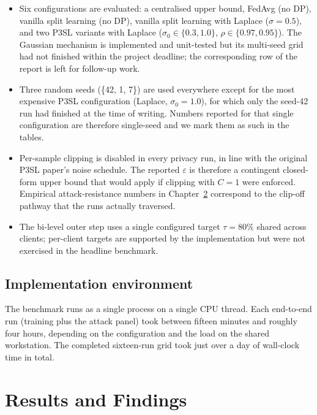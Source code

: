 \documentclass[11pt,a4paper,oneside]{report}
\begin{document}
\begin{itemize}[itemsep=2pt]
 \item Six configurations are evaluated: a centralised upper bound,
 FedAvg (no DP), vanilla split learning (no DP), vanilla split
 learning with Laplace ($\sigma{=}0.5$), and two P3SL variants
 with Laplace ($\sigma_0 \in \{0.3, 1.0\}$, $\rho \in
 \{0.97, 0.95\}$). The Gaussian mechanism is implemented and
 unit-tested but its multi-seed grid had not finished within
 the project deadline; the corresponding row of the report is
 left for follow-up work.
 \item Three random seeds (\{42, 1, 7\}) are used everywhere except
 for the most expensive P3SL configuration (Laplace,
 $\sigma_0{=}1.0$), for which only the seed-42 run had
 finished at the time of writing. Numbers reported for that
 single configuration are therefore single-seed and we mark
 them as such in the tables.
 \item Per-sample clipping is disabled in every privacy run, in
 line with the original P3SL paper's noise schedule. The
 reported $\varepsilon$ is therefore a contingent closed-form
 upper bound that would apply if clipping with $C{=}1$ were
 enforced. Empirical attack-resistance numbers in
 Chapter~\ref{ch:results} correspond to the clip-off pathway
 that the runs actually traversed.
 \item The bi-level outer step uses a single configured target
 $\tau{=}80\%$ shared across clients; per-client targets are
 supported by the implementation but were not exercised in
 the headline benchmark.
\end{itemize}

\section{Implementation environment}

The benchmark runs as a single process on a single CPU thread. Each
end-to-end run (training plus the attack panel) took between fifteen
minutes and roughly four hours, depending on the configuration and
the load on the shared workstation. The completed sixteen-run grid
took just over a day of wall-clock time in total.

\chapter{Results and Findings}
\label{ch:results}
\end{document}
